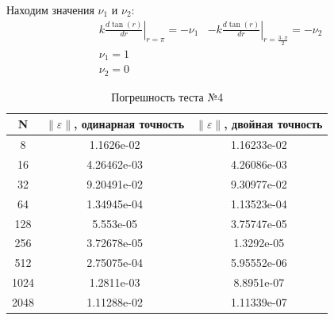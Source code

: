   Находим значения $ \nu_1 $ и $ \nu_2 $:
  \begin{align*}
		&k \left. \frac{d\tan(r)}{dr}\right\vert_{r = \pi} = -\nu _1
		&-k \left. \frac{d\tan(r)}{dr}\right\vert_{r = \frac{3 \cdot \pi}{2}} = -\nu_2 \\
    & \nu_1 = 1 \\
    &\nu_2 = 0
  \end{align*}
  \begin{table}[H]
    \centering
    \begin{tabular}{c | c | c}
      \toprule
      N & $ \left\lVert \varepsilon \right\rVert  $, одинарная точность & $ \left\lVert \varepsilon \right\rVert  $, двойная точность \\
      \midrule
      8 & 1.1626e-02 & 1.16233e-02\\
      16 & 4.26462e-03 & 4.26086e-03\\
      32 & 9.20491e-02 & 9.30977e-02\\
      64 & 1.34945e-04 & 1.13523e-04\\
      128 & 5.553e-05 & 3.75747e-05\\
      256 & 3.72678e-05 & 1.3292e-05\\
      512 & 2.75075e-04 & 5.95552e-06\\
      1024 & 1.2811e-03 & 8.8951e-07\\
      2048 & 1.11288e-02 & 1.11339e-07\\
      \bottomrule
    \end{tabular}
    \caption{Погрешность теста №4}
  \end{table}